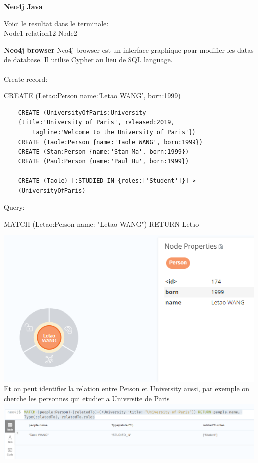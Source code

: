 \documentclass[12pt]{fphw}
\begin{document}
\textbf{Neo4j Java}

Voici le resultat dans le terminale:\\
Node1 relation12 Node2

\newpage
\textbf{Neo4j browser}
Neo4j browser est un interface graphique pour modifier les datas de database. Il utilise Cypher au lieu de SQL language. \\
 \\
Create record:
\begin{center}
	CREATE (Letao:Person {name:'Letao WANG', born:1999})
\end{center}




\begin{lstlisting}
	CREATE (UniversityOfParis:University 
	{title:'University of Paris', released:2019, 
		tagline:'Welcome to the University of Paris'})
	CREATE (Taole:Person {name:'Taole WANG', born:1999})
	CREATE (Stan:Person {name:'Stan Ma', born:1999})
	CREATE (Paul:Person {name:'Paul Hu', born:1999})
	
	CREATE (Taole)-[:STUDIED_IN {roles:['Student']}]->
	(UniversityOfParis)
\end{lstlisting}

Query:
\begin{center}
	MATCH (Letao:Person {name: "Letao WANG"}) RETURN Letao\\ 
	
	
	
\end{center}

\begin{center}
	\includegraphics[width=0.5\columnwidth]{NeoWang.png} %
	\newline\newline
	Et on peut identifier la relation entre Person et University aussi, par exemple on cherche les personnes qui etudier a Universite de Paris\newline\newline
	\includegraphics[width=1\columnwidth]{NeoUParis.png} %
\end{center}
\end{document}
